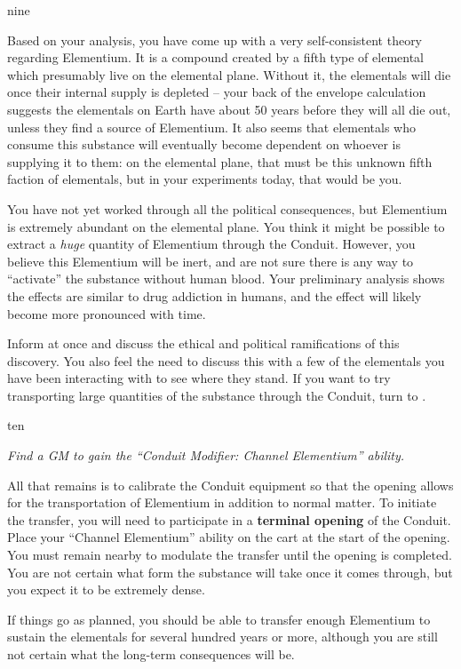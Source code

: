 \documentclass[notebook]{elementals}
\begin{document}
\begin{page}{nine}

Based on your analysis, you have come up with a very self-consistent theory regarding Elementium. It is a compound created by a fifth type of elemental which presumably live on the elemental plane. Without it, the elementals will die once their internal supply is depleted -- your back of the envelope calculation suggests the elementals on Earth have about 50 years before they will all die out, unless they find a source of Elementium. It also seems that elementals who consume this substance will eventually become dependent on whoever is supplying it to them: on the elemental plane, that must be this unknown fifth faction of elementals, but in your experiments today, that would be you.

You have not yet worked through all the political consequences, but Elementium is extremely abundant on the elemental plane. You think it might be possible to extract a \emph{huge} quantity of Elementium through the Conduit. However, you believe this Elementium will be inert, and are not sure there is any way to ``activate'' the substance without human blood. Your preliminary analysis shows the effects are similar to drug addiction in humans, and the effect will likely become more pronounced with time.

Inform \cDiplomat{} at once and discuss the ethical and political ramifications of this discovery. You also feel the need to discuss this with a few of the elementals you have been interacting with to see where they stand. If you want to try transporting large quantities of the substance through the Conduit, turn to .


\end{page}

\begin{page}{ten}

\emph{Find a GM to gain the ``Conduit Modifier: Channel Elementium'' ability.}

All that remains is to calibrate the Conduit equipment so that the opening allows for the transportation of Elementium in addition to normal matter. To initiate the transfer, you will need to participate in a \textbf{terminal opening} of the Conduit. Place your ``Channel Elementium'' ability on the cart at the start of the opening. You must remain nearby to modulate the transfer until the opening is completed. You are not certain what form the substance will take once it comes through, but you expect it to be extremely dense.

If things go as planned, you should be able to transfer enough Elementium to sustain the elementals for several hundred years or more, although you are still not certain what the long-term consequences will be.

\end{page}

\endnotebook
\end{document}
